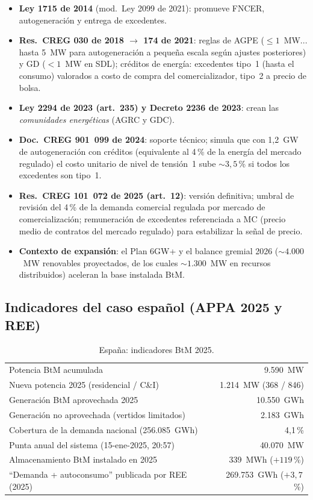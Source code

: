 \begin{itemize}
\item \textbf{Ley 1715 de 2014} (mod.\ Ley 2099 de 2021): promueve FNCER,
autogeneración y entrega de excedentes.
\item \textbf{Res.\ CREG 030 de 2018 $\to$ 174 de 2021}: reglas de AGPE
($\le1$~MW... hasta 5~MW para autogeneración a pequeña escala según ajustes
posteriores) y GD ($<1$~MW en SDL); créditos de energía: excedentes tipo~1
(hasta el consumo) valorados a costo de compra del comercializador, tipo~2 a
precio de bolsa.
\item \textbf{Ley 2294 de 2023 (art.\ 235) y Decreto 2236 de 2023}: crean las
\emph{comunidades energéticas} (AGRC y GDC).
\item \textbf{Doc.\ CREG 901~099 de 2024}: soporte técnico; simula que con
1,2~GW de autogeneración con créditos (equivalente al 4\,\% de la energía del
mercado regulado) el costo unitario de nivel de tensión~1 sube
${\sim}3{,}5$\,\% si todos los excedentes son tipo~1.
\item \textbf{Res.\ CREG 101~072 de 2025 (art.\ 12)}: versión definitiva;
umbral de revisión del 4\,\% de la demanda comercial regulada por mercado de
comercialización; remuneración de excedentes referenciada a MC (precio medio
de contratos del mercado regulado) para estabilizar la señal de precio.
\item \textbf{Contexto de expansión}: el Plan 6GW+ y el balance gremial 2026
(${\sim}4.000$~MW renovables proyectados, de los cuales ${\sim}1.300$~MW en
recursos distribuidos) aceleran la base instalada BtM.
\end{itemize}

\subsection{Indicadores del caso español (APPA 2025 y REE)}

\begin{table}[H]\centering\small
\caption{España: indicadores BtM 2025.}
\begin{tabular}{lr}
\toprule
Potencia BtM acumulada & 9.590~MW\\
Nueva potencia 2025 (residencial / C\&I) & 1.214~MW (368 / 846)\\
Generación BtM aprovechada 2025 & 10.550~GWh\\
Generación no aprovechada (vertidos limitados) & 2.183~GWh\\
Cobertura de la demanda nacional (256.085~GWh) & 4,1\,\%\\
Punta anual del sistema (15-ene-2025, 20:57) & 40.070~MW\\
Almacenamiento BtM instalado en 2025 & 339~MWh ($+119$\,\%)\\
``Demanda + autoconsumo'' publicada por REE (2025) & 269.753~GWh ($+3{,}7$\,\%)\\
\bottomrule
\end{tabular}
\end{table}

